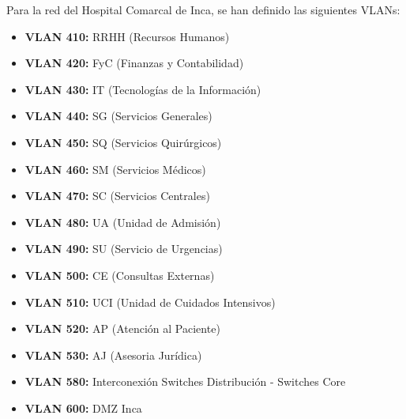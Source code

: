 Para la red del Hospital Comarcal de Inca, se han definido las siguientes VLANs:
\begin{itemize}
    \item \textbf{VLAN 410:} RRHH (Recursos Humanos)
    \item \textbf{VLAN 420:} FyC (Finanzas y Contabilidad)
    \item \textbf{VLAN 430:} IT (Tecnologías de la Información)
    \item \textbf{VLAN 440:} SG (Servicios Generales)
    \item \textbf{VLAN 450:} SQ (Servicios Quirúrgicos)
    \item \textbf{VLAN 460:} SM (Servicios Médicos)
    \item \textbf{VLAN 470:} SC (Servicios Centrales)
    \item \textbf{VLAN 480:} UA (Unidad de Admisión)
    \item \textbf{VLAN 490:} SU (Servicio de Urgencias)
    \item \textbf{VLAN 500:} CE (Consultas Externas)
    \item \textbf{VLAN 510:} UCI (Unidad de Cuidados Intensivos)
    \item \textbf{VLAN 520:} AP (Atención al Paciente)
    \item \textbf{VLAN 530:} AJ (Asesoria Jurídica)
    \item \textbf{VLAN 580:} Interconexión Switches Distribución - Switches Core
    \item \textbf{VLAN 600:} DMZ Inca
\end{itemize}

